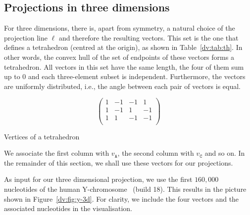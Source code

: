 \documentclass[oribibl]{lncs/llncs}
\begin{document}
\subsection{Projections in three dimensions}
For three dimensions, there is, apart from symmetry, a natural choice of the
projection line $\ell$ and therefore the resulting vectors. This set is the one
that defines a tetrahedron (centred at the origin), as shown in
Table~\ref{dv:tab:th}. In other words, the convex hull of the set of endpoints
of these vectors forms a tetrahedron. All vectors in this set have the same
length, the four of them sum up to $0$ and each three-element subset is
independent. Furthermore, the vectors are uniformly distributed, i.e., the
angle between each pair of vectors is equal.

\begin{table}[H]
\begin{displaymath}
\left(
\begin{array}{rrrr}
1 & -1 & -1 &  1\\
1 & -1 &  1 & -1\\
1 &  1 & -1 & -1\\
\end{array}
\right)
\end{displaymath}
\caption{Vertices of a tetrahedron}
\label{dv:tab:th}
\end{table}

We associate the first column with $v_\mathtt{A}$, the second column with 
$v_\mathtt{C}$ and so on. In the remainder of this section, we shall use these
vectors for our projections.

As input for our three dimensional projection, we use the first $160,\!000$
nucleotides of the human Y-chromosome~\cite{GN} (build 18). This results in the
picture shown in Figure~\ref{dv:fig:y-3d}. For clarity, we include the four
vectors and the associated nucleotides in the visualisation. 
\end{document}
